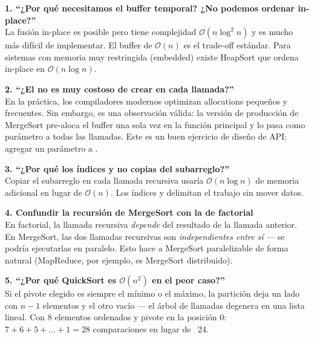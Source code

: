 \documentclass[12pt, oneside]{article}
\begin{document}
\begin{notaprofesor}

\textbf{1. ``¿Por qué necesitamos el buffer temporal? ¿No podemos ordenar
in-place?''}\\
La fusión in-place es posible pero tiene complejidad $\mathcal{O}(n \log^2 n)$
y es mucho más difícil de implementar. El buffer de $\mathcal{O}(n)$ es el
trade-off estándar. Para sistemas con memoria muy restringida (embedded)
existe HeapSort que ordena in-place en $\mathcal{O}(n \log n)$.

\vspace{0.6em}
\textbf{2. ``¿El  no es muy costoso de crear en
cada llamada?''}\\
En la práctica, los compiladores modernos optimizan allocations pequeños y
frecuentes. Sin embargo, es una observación válida: la versión de producción
de MergeSort pre-aloca el buffer una sola vez en la función principal y lo
pasa como parámetro a todas las llamadas. Este es un buen ejercicio de diseño
de API: agregar un parámetro  a .

\vspace{0.6em}
\textbf{3. ``¿Por qué los índices y no copias del subarreglo?''}\\
Copiar el subarreglo en cada llamada recursiva usaría $\mathcal{O}(n \log n)$
de memoria adicional en lugar de $\mathcal{O}(n)$. Los índices  y
 delimitan el trabajo sin mover datos.

\vspace{0.6em}
\textbf{4. Confundir la recursión de MergeSort con la de factorial}\\
En factorial, la llamada recursiva \textit{depende} del resultado de la llamada
anterior. En MergeSort, las dos llamadas recursivas son \textit{independientes
entre sí} — se podría ejecutarlas en paralelo. Esto hace a MergeSort
paralelizable de forma natural (MapReduce, por ejemplo, es MergeSort distribuido).

\vspace{0.6em}
\textbf{5. ``¿Por qué QuickSort es $\mathcal{O}(n^2)$ en el peor caso?''}\\
Si el pivote elegido es siempre el mínimo o el máximo, la partición deja
un lado con $n-1$ elementos y el otro vacío — el árbol de llamadas degenera
en una lista lineal. Con 8 elementos ordenados y pivote en la posición 0:
$7 + 6 + 5 + \ldots + 1 = 28$ comparaciones en lugar de ~24.

\end{notaprofesor}
\end{document}
